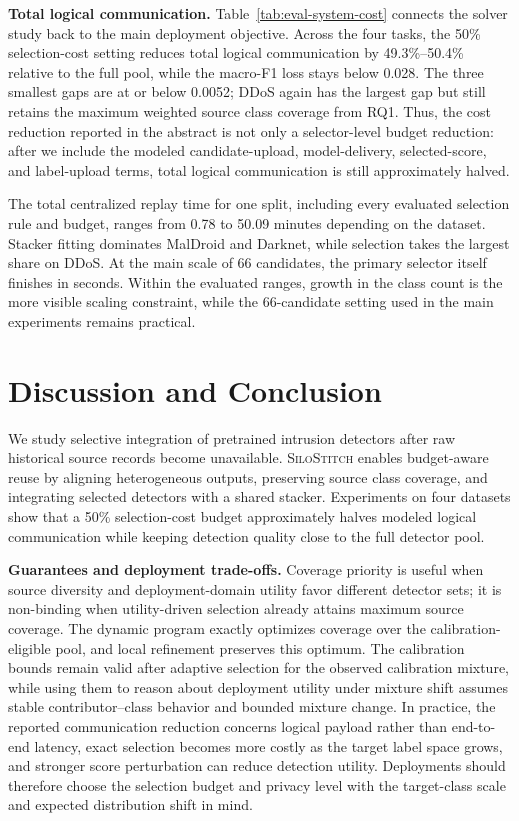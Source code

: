 \documentclass[conference]{IEEEtran}
\theoremstyle{definition}
\newcommand{\Fname}{\textsc{SiloStitch}\xspace}
\newcommand{\bheading}[1]{\noindent\textbf{#1.}\xspace}
\begin{document}
\bheading{Total logical communication}
Table~\ref{tab:eval-system-cost} connects the solver study back to the main deployment objective.
Across the four tasks, the 50\% selection-cost setting reduces total logical communication by 49.3\%--50.4\% relative to the full pool, while the macro-F1 loss stays below 0.028.
The three smallest gaps are at or below 0.0052; DDoS again has the largest gap but still retains the maximum weighted source class coverage from RQ1.
Thus, the cost reduction reported in the abstract is not only a selector-level budget reduction: after we include the modeled candidate-upload, model-delivery, selected-score, and label-upload terms, total logical communication is still approximately halved.

The total centralized replay time for one split, including every evaluated selection rule and budget, ranges from 0.78 to 50.09 minutes depending on the dataset.
Stacker fitting dominates MalDroid and Darknet, while selection takes the largest share on DDoS.
At the main scale of 66 candidates, the primary selector itself finishes in seconds.
Within the evaluated ranges, growth in the class count is the more visible scaling constraint, while the 66-candidate setting used in the main experiments remains practical.

\section{Discussion and Conclusion}
\label{sec:discussion_conclusion}

We study selective integration of pretrained intrusion detectors after raw historical source records become unavailable.
\Fname enables budget-aware reuse by aligning heterogeneous outputs, preserving source class coverage, and integrating selected detectors with a shared stacker.
Experiments on four datasets show that a 50\% selection-cost budget approximately halves modeled logical communication while keeping detection quality close to the full detector pool.

\noindent\textbf{Guarantees and deployment trade-offs.}
Coverage priority is useful when source diversity and deployment-domain utility favor different detector sets; it is non-binding when utility-driven selection already attains maximum source coverage.
The dynamic program exactly optimizes coverage over the calibration-eligible pool, and local refinement preserves this optimum.
The calibration bounds remain valid after adaptive selection for the observed calibration mixture, while using them to reason about deployment utility under mixture shift assumes stable contributor--class behavior and bounded mixture change.
In practice, the reported communication reduction concerns logical payload rather than end-to-end latency, exact selection becomes more costly as the target label space grows, and stronger score perturbation can reduce detection utility.
Deployments should therefore choose the selection budget and privacy level with the target-class scale and expected distribution shift in mind.
\end{document}
